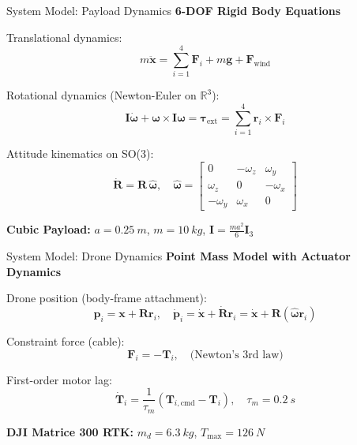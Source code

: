 \documentclass{beamer}
\begin{document}
\begin{frame}{System Model: Payload Dynamics}
\textbf{6-DOF Rigid Body Equations}

Translational dynamics:
\[
m\ddot{\mathbf{x}} = \sum_{i=1}^{4} \mathbf{F}_i + m\mathbf{g} + \mathbf{F}_{\text{wind}}
\]

Rotational dynamics (Newton-Euler on $\mathbb{R}^3$):
\[
\mathbf{I}\dot{\boldsymbol{\omega}} + \boldsymbol{\omega} \times \mathbf{I}\boldsymbol{\omega} = \boldsymbol{\tau}_{\text{ext}} = \sum_{i=1}^{4} \mathbf{r}_i \times \mathbf{F}_i
\]

Attitude kinematics on SO(3):
\[
\dot{\mathbf{R}} = \mathbf{R} \, \widehat{\boldsymbol{\omega}}, \quad \widehat{\boldsymbol{\omega}} = \begin{bmatrix} 0 & -\omega_z & \omega_y \\ \omega_z & 0 & -\omega_x \\ -\omega_y & \omega_x & 0 \end{bmatrix}
\]

\textbf{Cubic Payload:} $a = \SI{0.25}{m}$, $m = \SI{10}{kg}$, $\mathbf{I} = \frac{ma^2}{6}\mathbf{I}_3$
\end{frame}

\begin{frame}{System Model: Drone Dynamics}
\textbf{Point Mass Model with Actuator Dynamics}

Drone position (body-frame attachment):
\[
\mathbf{p}_i = \mathbf{x} + \mathbf{R}\mathbf{r}_i, \quad \dot{\mathbf{p}}_i = \dot{\mathbf{x}} + \dot{\mathbf{R}}\mathbf{r}_i = \dot{\mathbf{x}} + \mathbf{R}(\widehat{\boldsymbol{\omega}}\mathbf{r}_i)
\]

Constraint force (cable):
\[
\mathbf{F}_i = -\mathbf{T}_i, \quad \text{(Newton's 3rd law)}
\]

First-order motor lag:
\[
\dot{\mathbf{T}}_i = \frac{1}{\tau_m}(\mathbf{T}_{i,\text{cmd}} - \mathbf{T}_i), \quad \tau_m = \SI{0.2}{s}
\]

\textbf{DJI Matrice 300 RTK:} $m_d = \SI{6.3}{kg}$, $T_{\max} = \SI{126}{N}$
\end{frame}
\end{document}
